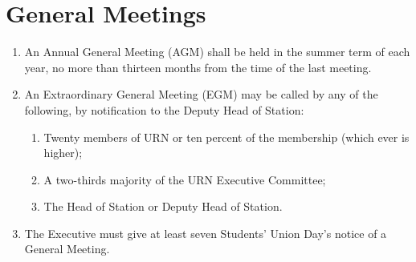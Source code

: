\section{General Meetings}

\begin{enumerate}[label*=\thesection.\arabic*.]
    \item An Annual General Meeting (AGM) shall be held in the summer term of each year, no more than thirteen months from the time of the last meeting.
    \item \label{itm:egm-conds} An Extraordinary General Meeting (EGM) may be called by any of the following, by notification to the Deputy Head of Station:
          \begin{enumerate}[label*=\arabic*.]
              \item Twenty members of URN or ten percent of the membership (which ever is higher);
              \item A two-thirds majority of the URN Executive Committee;
              \item The Head of Station or Deputy Head of Station.
          \end{enumerate}
    \item The Executive must give at least seven Students' Union Day's notice of a General Meeting.
\end{enumerate}
